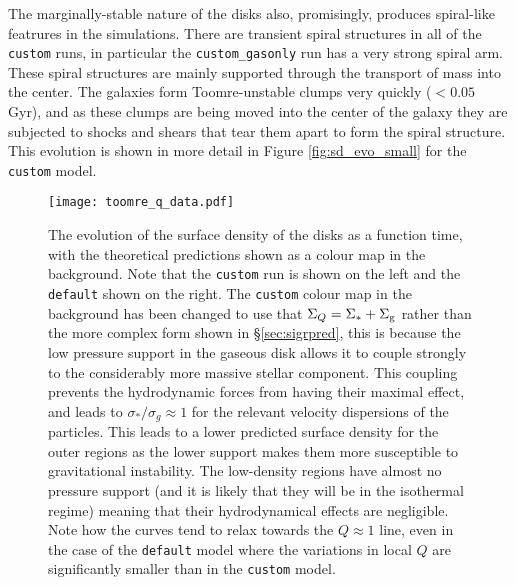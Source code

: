 The marginally-stable nature of the disks also, promisingly, produces spiral-like featrures in the simulations.
There are transient spiral structures in all of the {\tt custom} runs, in particular the {\tt custom\_gasonly} run has a very strong spiral arm.
These spiral structures are mainly supported through the transport of mass into the center.
The galaxies form Toomre-unstable clumps very quickly ($<0.05$ Gyr), and as these clumps are being moved into the center of the galaxy they are subjected to shocks and shears that tear them apart to form the spiral structure.
This evolution is shown in more detail in Figure \ref{fig:sd_evo_small} for the {\tt custom} model.

\begin{figure}
    \centering
    \texttt{[image: toomre\_q\_data.pdf]}
    \caption{The evolution of the surface density of the disks as a function time, with the theoretical predictions shown as a colour map in the background. Note that the {\tt custom} run is shown on the left and the {\tt default} shown on the right. The {\tt custom} colour map in the background has been changed to use that $\Sigma_Q = \Sigma_* + \Sigma_\mathrm{g}$ rather than the more complex form shown in \S \ref{sec:sigrpred}, this is because the low pressure support in the gaseous disk allows it to couple strongly to the considerably more massive stellar component. This coupling prevents the hydrodynamic forces from having their maximal effect, and leads to $\sigma_*/\sigma_g \approx 1$ for the relevant velocity dispersions of the particles. This leads to a lower predicted surface density for the outer regions as the lower support makes them more susceptible to gravitational instability. The low-density regions have almost no pressure support (and it is likely that they will be in the isothermal regime) meaning that their hydrodynamical effects are negligible. Note how the curves tend to relax towards the $Q\approx1$ line, even in the case of the {\tt default} model where the variations in local $Q$ are significantly smaller than in the {\tt custom} model.}
    \label{fig:toomreqthr_dat}
\end{figure}

